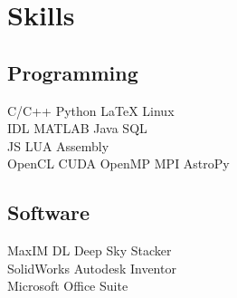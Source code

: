 \documentclass[letterpaper]{deedy-resume} %
\begin{document}

\lastupdated %



\begin{minipage}[t]{0.33\textwidth} %

\section{Skills}

\subsection{Programming}

C/C++ \textbullet{} Python \textbullet{} \LaTeX \textbullet{} Linux \\ 
IDL \textbullet{} MATLAB \textbullet{} Java \textbullet{} SQL\\
JS \textbullet{} LUA \textbullet{} Assembly \\
OpenCL \textbullet{} CUDA \textbullet{} OpenMP \textbullet{} MPI AstroPy
\vspace{5pt}\\

\subsection{Software}
MaxIM DL \textbullet{} Deep Sky Stacker\\
SolidWorks \textbullet{} Autodesk Inventor\\
Microsoft Office Suite



\end{minipage}
\end{document}
